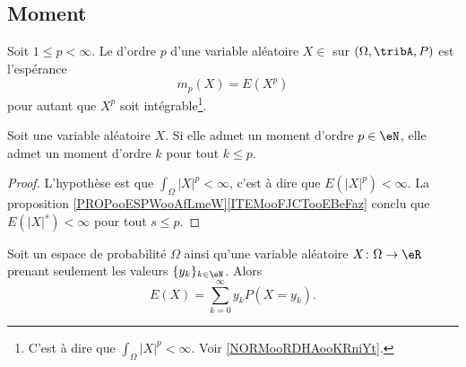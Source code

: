 \subsection{Moment}

\begin{definition}		\label{DEFooTECPooMzGYgG}
	Soit \( 1\leq p<\infty\). Le  d'ordre \( p\) d'une variable aléatoire \( X\in\) sur \( (\Omega,\tribA,P)\) est l'espérance
	\begin{equation}
		m_p(X)=E(X^p)
	\end{equation}
	pour autant que \( X^p\) soit intégrable\footnote{C'est à dire que \( \int_{\Omega}| X |^p<\infty\). Voir \ref{NORMooRDHAooKRniYt}.}.
\end{definition}


\begin{proposition}		\label{PROPooIQGWooZeQJgb}
	Soit une variable aléatoire \( X\). Si elle admet un moment d'ordre \( p\in \eN\), elle admet un moment d'ordre \( k\) pour tout \( k\leq p\).
\end{proposition}

\begin{proof}
	L'hypothèse est que \( \int_{\Omega}| X |^p<\infty\), c'est à dire que \( E(| X |^p)<\infty\). La proposition \ref{PROPooESPWooAfLmeW}\ref{ITEMooFJCTooEBeFaz} conclu que \( E(| X |^s)<\infty\) pour tout \( s\leq p\).
\end{proof}

\begin{lemma}        \label{LEMooEHTYooWmMAgf}
	Soit un espace de probabilité \( \Omega\) ainsi qu'une variable aléatoire \( X\colon \Omega\to \eR\) prenant seulement les valeurs \( \{ y_k \}_{k\in \eN}\). Alors
	\begin{equation}
		E(X)=\sum_{k=0}^{\infty}y_kP(X=y_k).
	\end{equation}
\end{lemma}


